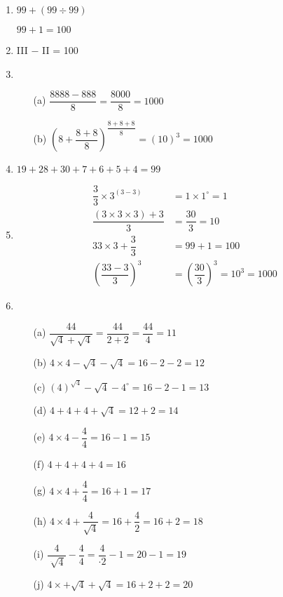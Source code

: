 \begin{enumerate}
\item $99 + (99\div 99)$

$99 + 1 = 100$

\item III $-$ II = 100

\item 
\begin{itemize}
\item[(a)] $\dfrac{8888 - 888}{8} = \dfrac{8000}{8} = 1000$
\item[(b)] $\left(8 + \dfrac{8+8}{8}\right)^{\dfrac{8+8+8}{8}} = (10)^{3} = 1000$
\end{itemize}

\item $19+28+30+7+6+5+4 = 99$

\item 
\begin{align*}
\dfrac{3}{3} \times 3^{(3-3)} & = 1\times 1^{\circ} = 1\\
\dfrac{(3\times 3\times 3) + 3}{3} & = \dfrac{30}{3} = 10\\
33\times 3 + \dfrac{3}{3} & = 99 + 1 = 100\\
\left(\dfrac{33-3}{3}\right)^{3} & = \left(\dfrac{30}{3}\right)^{3} = 10^{3} = 1000
\end{align*}

\item 
\begin{itemize}
\item[(a)] $\dfrac{44}{\sqrt{4} + \sqrt{4}} = \dfrac{44}{2+2} = \dfrac{44}{4} = 11$
\item[(b)] $4\times 4 - \sqrt{4} - \sqrt{4} = 16 - 2 - 2 = 12$
\item[(c)] $(4)^{\sqrt{4}} - \sqrt{4} - 4^{\circ} = 16 - 2 - 1 = 13$
\item[(d)] $4 + 4 + 4 + \sqrt{4} = 12 + 2 = 14$
\item[(e)] $4\times 4 - \dfrac{4}{4} = 16 - 1 = 15$
\item[(f)] $4+4+4+4 = 16$
\item[(g)] $4\times 4 + \dfrac{4}{4} = 16 + 1 = 17$
\item[(h)] $4\times 4 + \dfrac{4}{\sqrt{4}} = 16 + \dfrac{4}{2} = 16 + 2 = 18$
\item[(i)] $\dfrac{4}{\sqrt[\cdot]{4}} - \dfrac{4}{4} = \dfrac{4}{\cdot 2} - 1 = 20 - 1 = 19$
\item[(j)] $4\times + \sqrt{4} + \sqrt{4} = 16 + 2 + 2 = 20$
\end{itemize}


\end{enumerate}
